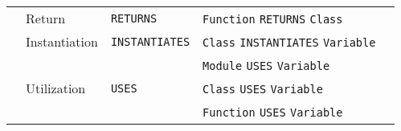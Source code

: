 \begin{tabularx}{\textwidth}{p{1.8cm}llXl}
 & Return & \texttt{RETURNS} & \texttt{Function} \texttt{RETURNS} \texttt{Class} &  \\
\cmidrule{2-2}\cmidrule{3-3}\cmidrule{4-4}
 & Instantiation & \texttt{INSTANTIATES} & \texttt{Class} \texttt{INSTANTIATES} \texttt{Variable} &  \\
\cmidrule{2-2}\cmidrule{3-3}\cmidrule{4-4}
 & \multirow{3}[6]{*}{Utilization} & \multirow{3}[6]{*}{\texttt{USES}} & \texttt{Module} \texttt{USES} \texttt{Variable} &  \\
\cmidrule{4-4}
 &  &  & \texttt{Class} \texttt{USES} \texttt{Variable} &  \\
\cmidrule{4-4}
 &  &  & \texttt{Function} \texttt{USES} \texttt{Variable} &  \\
\bottomrule
\end{tabularx}

